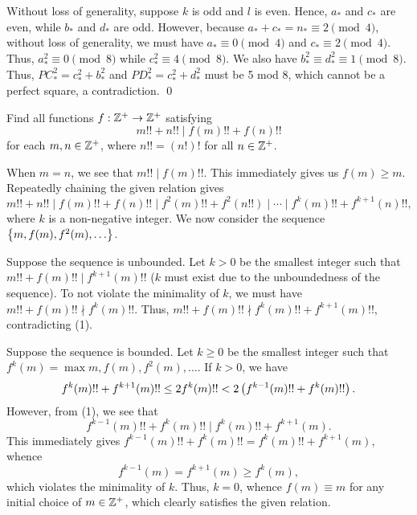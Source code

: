 \begin{solution*}
     Without loss of generality, suppose $k$ is odd and $l$ is even. Hence, $a_\ast$ and $c_\ast$ are even, while $b_\ast$ and $d_\ast$ are odd. However, because $a_\ast + c_\ast = n_\ast \equiv 2 \pmod{4}$, without loss of generality, we must have $a_\ast \equiv 0 \pmod{4}$ and $c_\ast \equiv 2 \pmod{4}$. Thus, $a_\ast^2 \equiv 0 \pmod{8}$ while $c_\ast^2 \equiv 4 \pmod{8}$. We also have $b_\ast^2 \equiv d_\ast^2 \equiv 1 \pmod{8}$. Thus, $PC_\ast^2 = c_\ast^2 + b_\ast^2$ and $PD_\ast^2 = c_\ast^2 + d_\ast^2$ must be 5 mod 8, which cannot be a perfect square, a contradiction. \qed
\end{solution*}

\begin{question}[${f(m) \equiv m}$]\label{A::2022-O-2-3}
    Find all functions $f : \mathbb{Z}^+ \to \mathbb{Z}^+$ satisfying \[m!! + n!! \mid f(m)!! + f(n)!!\] for each $m, n \in \mathbb{Z}^+$, where $n!! = (n!)!$ for all $n \in \mathbb{Z}^+$.
\end{question}
\begin{solution*}
    When $m = n$, we see that $m!! \mid f(m)!!$. This immediately gives us $f(m) \geq m$. Repeatedly chaining the given relation gives \[m!! + n!! \mid f(m)!! + f(n)!! \mid f^2(m)!! + f^2(n!!) \mid \cdots \mid f^k(m)!! + f^{k+1}(n)!!, \tag{1}\] where $k$ is a non-negative integer. We now consider the sequence $\left\lbrace m, f(m), f^2(m), \ldots \right\rbrace$.

     Suppose the sequence is unbounded. Let $k > 0$ be the smallest integer such that $m!! + f(m)!! \mid f^{k+1}(m)!!$ ($k$ must exist due to the unboundedness of the sequence). To not violate the minimality of $k$, we must have $m!! + f(m)!! \nmid f^k(m)!!$. Thus, $m!! + f(m)!! \nmid f^k(m)!! + f^{k+1}(m)!!$, contradicting (1).

     Suppose the sequence is bounded. Let $k \geq 0$ be the smallest integer such that $f^k(m) = \max{m, f(m), f^2(m), \ldots}$. If $k > 0$, we have \[f^k(m)!! + f^{k+1}(m)!! \leq 2f^k(m)!! < 2\left( f^{k-1}(m)!! + f^k(m)!! \right).\] However, from (1), we see that \[f^{k-1}(m)!! + f^k(m)!! \mid f^k(m)!! + f^{k+1}(m).\] This immediately gives $f^{k-1}(m)!! + f^k(m)!! = f^k(m)!! + f^{k+1}(m)$, whence \[f^{k-1}(m) = f^{k+1}(m) \geq f^k(m),\] which violates the minimality of $k$. Thus, $k =0$, whence $f(m) \equiv m$ for any initial choice of $m \in \mathbb{Z}^+$, which clearly satisfies the given relation.
\end{solution*}

